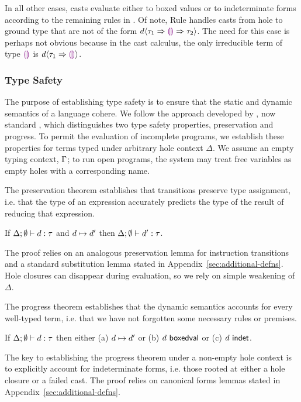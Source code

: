 In all other cases, casts evaluate either to boxed values or to
indeterminate forms according to the remaining rules
in .
%
Of note, Rule  handles casts from hole to
ground type that are not of
the form $d \langle{\tau_1}\Rightarrow{\textcolor{violet}{\llparenthesis}\textcolor{violet}{\rrparenthesis}}\Rightarrow{\tau_2}\rangle$.
%
The need for this case is perhaps not obvious because in the cast calculus,  the only irreducible term of type $\textcolor{violet}{\llparenthesis}\textcolor{violet}{\rrparenthesis}$
is $d \langle{\tau_1}\Rightarrow{\textcolor{violet}{\llparenthesis}\textcolor{violet}{\rrparenthesis}}\rangle$.

\subsubsection{Type Safety}
%
The purpose of establishing type safety is to ensure that the static and dynamic semantics of a
language cohere.
%
We follow the approach developed by \citet{wright94:_type_soundness},
now standard \cite{pfpl}, which distinguishes two type safety
properties, preservation and progress.
%
To permit the evaluation of incomplete programs, we establish these
properties for terms typed under arbitrary hole context $\Delta$.
%
We assume an empty typing context, $\Gamma$; to run open programs, the
system may treat free variables as empty holes with a corresponding
name.

The preservation theorem establishes that transitions preserve type
assignment, i.e. that the type of an expression accurately predicts
the type of the result of reducing that expression.

\begin{thm}[Preservation]
  If $\Delta; \emptyset \vdash d : \tau$ and
  $d \mapsto d'$ then
  $\Delta; \emptyset \vdash d' : \tau$.
\end{thm}
\noindent
%
The proof relies on an analogous preservation lemma for instruction
transitions and a standard substitution lemma stated in
Appendix~\ref{sec:additional-defns}.
%
Hole closures can disappear during evaluation, so we rely on simple weakening
of $\Delta$.

The progress theorem establishes that the dynamic semantics accounts
for every well-typed term, i.e. that we have not forgotten some
necessary rules or premises.
%
\begin{thm}[Progress]
  If $\Delta; \emptyset \vdash d : \tau$ then either
  (a) $d \mapsto d'$ or
  (b) $d~\mathsf{boxedval}$ or
  (c) $d~\mathsf{indet}$.
\end{thm}
\noindent
The key to establishing the progress theorem under a non-empty hole
context is to explicitly account for indeterminate forms,
i.e. those rooted at either a hole closure or a failed cast.
%
The proof relies on canonical forms lemmas stated in
Appendix~\ref{sec:additional-defns}.


